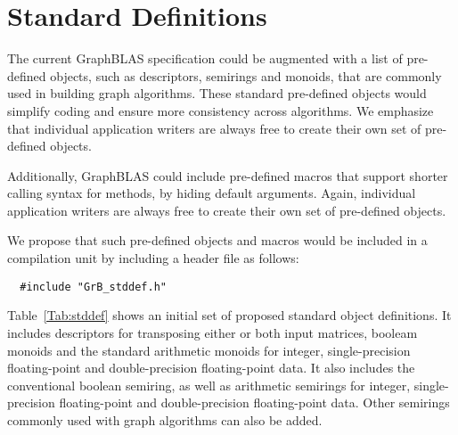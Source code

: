 \section{Standard Definitions}
\label{Sec:stddef}

\newcommand{\integer}{{\sf int32\_t}}
\newcommand{\float}{{\sf float}}
\newcommand{\double}{{\sf double}}
\newcommand{\bool}{{\sf bool}}
\newcommand{\false}{{\sf false}}
\newcommand{\true}{{\sf true}}

The current GraphBLAS specification could be augmented with a list of 
pre-defined objects, such as descriptors, semirings and monoids, that are commonly used
in building graph algorithms. These standard pre-defined objects would
simplify coding and ensure more consistency across algorithms. 
We emphasize
that individual application writers are always free to create their own set of
pre-defined objects.

Additionally, GraphBLAS could include pre-defined macros that support
shorter calling syntax for methods, by hiding default arguments. 
Again, individual application writers are always free to create their
own set of pre-defined objects.

We propose that such pre-defined objects and macros would
be included in a compilation unit by including a header file as follows:

\begin{verbatim}
  #include "GrB_stddef.h"
\end{verbatim}

Table~\ref{Tab:stddef} shows an initial set of proposed standard object
definitions.  It includes descriptors for transposing either or both input
matrices, booleam monoids and the standard arithmetic monoids for integer,
single-precision floating-point and double-precision floating-point
data.  It also includes the conventional boolean semiring, as well as
arithmetic semirings for integer, single-precision floating-point and
double-precision floating-point data.  Other semirings commonly used
with graph algorithms can also be added.

